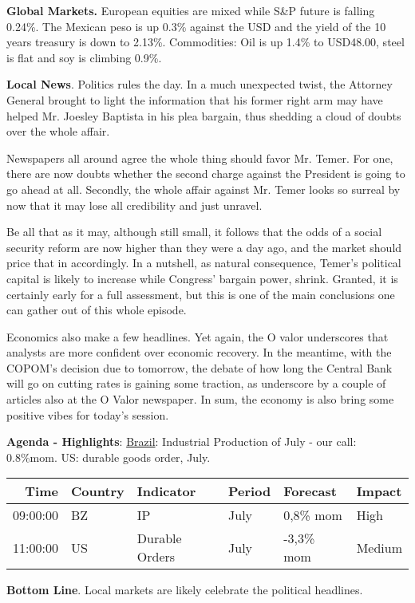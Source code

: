 \documentclass[11pt]{article}
\date{\today}
\title{}
\begin{document}
\tableofcontents

\textbf{Global Markets.} European equities are mixed while S\&P future is
falling 0.24\%. The Mexican peso is up 0.3\% against the USD and the
yield of the 10 years treasury is down to 2.13\%. Commodities: Oil is
up 1.4\% to USD48.00, steel is flat and soy is climbing 0.9\%.

\textbf{Local News}. Politics rules the day. In a much unexpected twist, the
Attorney General brought to light the information that his former
right arm may have helped Mr. Joesley Baptista in his plea bargain,
thus shedding a cloud of doubts over the whole affair.

Newspapers all around agree the whole thing should favor
Mr. Temer. For one, there are now doubts whether the second charge
against the President is going to go ahead at all. Secondly, the whole
affair against Mr. Temer looks so surreal by now that it may lose all
credibility and just unravel.

Be all that as it may, although still small, it follows that the odds
of a social security reform are now higher than they were a day ago,
and the market should price that in accordingly.  In a nutshell,
as natural consequence, Temer's political capital is likely to increase
while Congress' bargain power, shrink. Granted, it is certainly early
for a full assessment, but this is one of the main conclusions one can
gather out of this whole episode.

Economics also make a few headlines. Yet again, the O valor
underscores that analysts are more confident over economic
recovery. In the meantime, with the COPOM's decision due to tomorrow,
the debate of how long the Central Bank will go on cutting rates is
gaining some traction, as underscore by a couple of articles also at
the O Valor newspaper. In sum, the economy is also bring some positive
vibes for today's session.

\textbf{Agenda - Highlights}: \uline{Brazil}: Industrial Production of July - our
call: 0.8\%mom. US: durable goods order, July.

\vspace{-0.5cm}
\begin{center}
\begin{tabular}{rlllll}
\textbf{Time} & \textbf{Country} & \textbf{Indicator} & \textbf{Period} & \textbf{Forecast} & \textbf{Impact}\\
\hline
09:00:00 & BZ & IP & July & 0,8\% mom & High\\
11:00:00 & US & Durable Orders & July & -3,3\% mom & Medium\\
\end{tabular}
\end{center}

\textbf{Bottom Line}. Local markets are likely celebrate the political
headlines.
\end{document}
